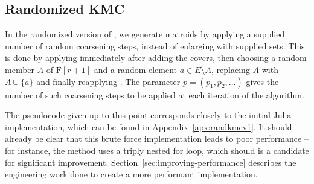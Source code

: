 \subsection{Randomized KMC}
In the randomized version of , we generate matroids by applying a supplied number of random coarsening steps, instead of enlarging with supplied sets. This is done by applying  immediately after adding the covers, then choosing a random member $A$ of $\mathrm{F}[r+1]$ and a random element $a \in E \setminus A$, replacing $A$ with $A \cup \{a\}$ and finally reapplying . The parameter $p = (p_1, p_2, \ldots)$ gives the number of such coarsening steps to be applied at each iteration of the algorithm.

The pseudocode given up to this point corresponds closely to the initial Julia implementation, which can be found in Appendix~\ref{apx:randkmcv1}. It should already be clear that this brute force implementation leads to poor performance -- for instance, the  method uses a triply nested for loop, which should is a candidate for significant improvement. Section~\ref{sec:improving-performance} describes the engineering work done to create a more performant implementation.

